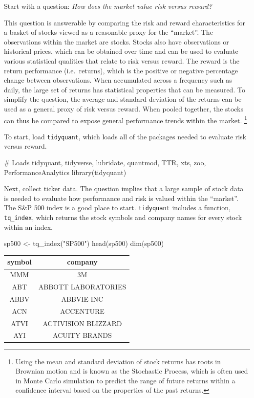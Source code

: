 Start with a question: \emph{How does the market value risk versus
reward?}

This question is answerable by comparing the risk and reward
characteristics for a basket of stocks viewed as a reasonable proxy for
the ``market''. The observations within the market are stocks. Stocks
also have observations or historical prices, which can be obtained over
time and can be used to evaluate various statistical qualities that
relate to risk versus reward. The reward is the return performance
(i.e.~returns), which is the positive or negative percentage change
between observations. When accumulated across a frequency such as daily,
the large set of returns has statistical properties that can be
measured. To simplify the question, the average and standard deviation
of the returns can be used as a general proxy of risk versus reward.
When pooled together, the stocks can thus be compared to expose general
performance trends within the market.
\footnote{Using the mean and standard deviation of stock returns has roots in Brownian motion and is known as the Stochastic Process, which is often used in Monte Carlo simulation to predict the range of future returns within a confidence interval based on the properties of the past returns. }

To start, load \texttt{tidyquant}, which loads all of the packages
needed to evaluate risk versus reward.

\begin{Schunk}
\begin{Sinput}
# Loads tidyquant, tidyverse, lubridate, quantmod, TTR, xts, zoo, PerformanceAnalytics
library(tidyquant)
\end{Sinput}
\end{Schunk}

Next, collect ticker data. The question implies that a large sample of
stock data is needed to evaluate how performance and risk is valued
within the ``market''. The S\&P 500 index is a good place to start.
\texttt{tidyquant} includes a function, \texttt{tq\_index}, which
returns the stock symbols and company names for every stock within an
index.

\begin{Schunk}
\begin{Sinput}
sp500 <- tq_index("SP500")
head(sp500)
dim(sp500)
\end{Sinput}
\end{Schunk}

\begin{tabular}{cc}
\toprule
symbol & company\\
\midrule
MMM & 3M\\
ABT & ABBOTT LABORATORIES\\
ABBV & ABBVIE INC\\
ACN & ACCENTURE\\
ATVI & ACTIVISION BLIZZARD\\
AYI & ACUITY BRANDS\\
\bottomrule
\end{tabular}

